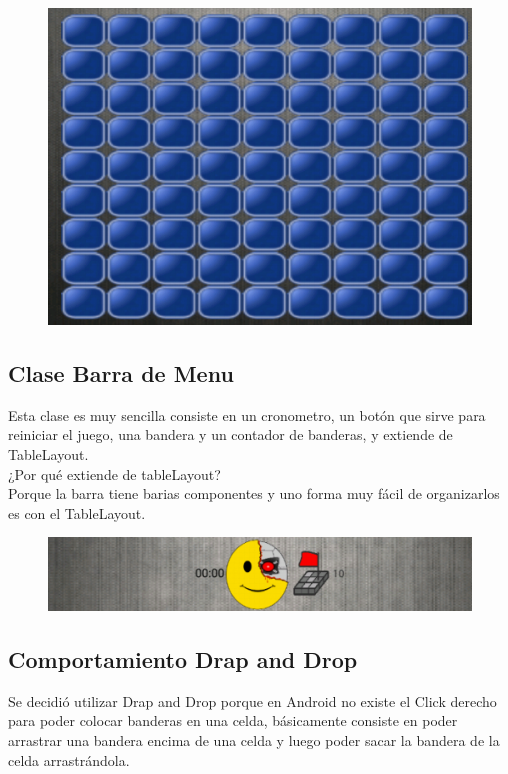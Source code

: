 \documentclass[11pt]{article} %
\begin{document}
\begin{figure}[H]
 \begin{center}
    \includegraphics{imagenes_Documentacion/tablero}
\end{center}
\caption {}
\label{Tablero}
\end{figure}


\subsection{Clase Barra de Menu}
Esta clase es muy sencilla consiste en un cronometro, un botón que sirve para reiniciar el juego, una bandera y un contador de banderas, y extiende de TableLayout.\\
¿Por qué extiende de tableLayout?\\
Porque la barra tiene barias componentes y uno forma muy fácil de organizarlos es con el TableLayout.\\

\begin{figure}[H]
 \begin{center}
    \includegraphics{imagenes_Documentacion/barraMenu}
\end{center}
\caption {}
\label{Barra de Menu}
\end{figure}


\subsection{Comportamiento Drap and Drop}
Se decidió utilizar Drap and Drop porque en Android no existe el Click derecho para poder colocar banderas en una celda, básicamente consiste en poder arrastrar una bandera encima de una celda y luego poder sacar la bandera de la celda arrastrándola.
\end{document}
